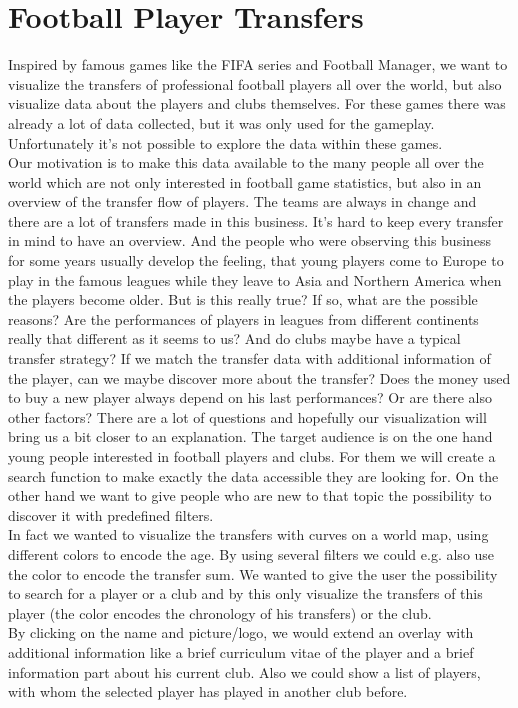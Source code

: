 \documentclass[a4paper]{tufte-book}
\begin{document}
\section{Football Player Transfers}
Inspired by famous games like the FIFA series and Football Manager, we want to visualize the transfers of professional football players all over the world, but also visualize data about the players and clubs themselves. For these games there was already a lot of data collected, but it was only used for the gameplay. Unfortunately it's not possible to explore the data within these games. \\
Our motivation is to make this data available to the many people all over the world which are not only interested in football game statistics, but also in an overview of the transfer flow of players. The teams are always in change and there are a lot of transfers made in this business. It's hard to keep every transfer in mind to have an overview. And the people who were observing this business for some years usually develop the feeling, that young players come to Europe to play in the famous leagues while they leave to Asia and Northern America when the players become older. But is this really true? If so, what are the possible reasons? Are the performances of players in leagues from different continents really that different as it seems to us? And do clubs maybe have a typical transfer strategy? If we match the transfer data with additional information of the player, can we maybe discover more about the transfer? Does the money used to buy a new player always depend on his last performances? Or are there also other factors? There are a lot of questions and hopefully our visualization will bring us a bit closer to an explanation. The target audience is on the one hand young people interested in football players and clubs. For them 
we will create a search function to make exactly the data accessible they are looking for. On the other hand we want to give people who are new to that topic the possibility to discover it with predefined filters. \\
In fact we wanted to visualize the transfers with curves on a world map, using different colors to encode the age. By using several filters we could e.g. also use the color to encode the transfer sum. We wanted to give the user the possibility to search for a player or a club and by this only visualize the transfers of this player (the color encodes the chronology of his transfers) or the club. \\
By clicking on the name and picture/logo, we would extend an overlay with additional information like a brief curriculum vitae of the player and a brief information part about his current club. Also we could show a list of players, with whom the selected player has played in another club before.
\end{document}

